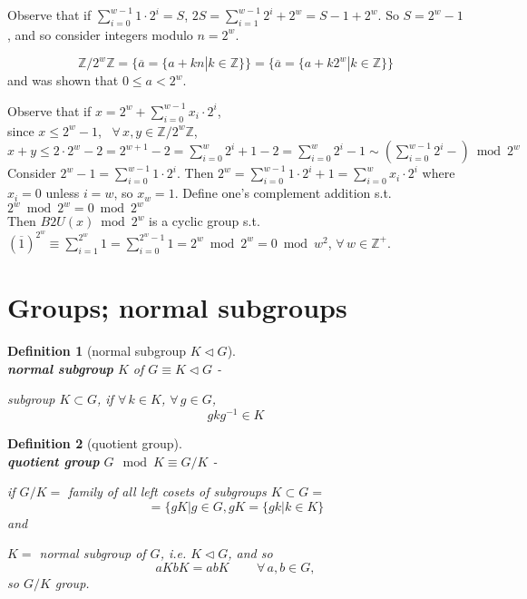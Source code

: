 \documentclass[10pt]{amsart}
\newtheorem{definition}{Definition}
\begin{document}
\begin{multicols*}{2}
Observe that if $\sum_{i=0}^{w-1} 1 \cdot 2^i = S$, $2S = \sum_{i=1}^{w-1} 2^i + 2^w = S - 1  + 2^w$. So $S = 2^w-1$, and so consider integers modulo $n=2^w$. 

\[
\mathbb{Z} / 2^w \mathbb{Z} = \lbrace \overline{a} = \lbrace a + kn | k \in \mathbb{Z} \rbrace \rbrace = \lbrace \overline{a} = \lbrace a + k 2^w | k \in \mathbb{Z} \rbrace \rbrace
\]
and was shown that $0\leq a < 2^w$.

Observe that if $x=  2^w + \sum_{i=0}^{w-1} x_i \cdot 2^i$, \\

since $x \leq 2^w - 1$, \, $\forall \, x,y \in \mathbb{Z} / 2^w \mathbb{Z}$, $x+y\leq 2 \cdot 2^w - 2 = 2^{w+1} - 2 = \sum_{i=0}^w 2^i + 1 - 2 = \sum_{i=0}^w 2^i - 1 \sim \left( \sum_{i=0}^{w-1} 2^i - \right) \bmod{2^w}$ \\


Consider $2^w - 1 = \sum_{i=0}^{w-1} 1 \cdot 2^i$. Then $2^w = \sum_{i=0}^{w-1} 1 \cdot 2^i + 1  = \sum_{i=0}^w x_i \cdot 2^i$ where $x_i = 0$ unless $i=w$, so $x_w = 1$. Define one's complement addition s.t. $2^w \bmod{2^w} = 0 \bmod 2^w$ \\

Then $B2U(x) \bmod{2^w}$ is a cyclic group s.t. $(\overline{1})^{2^w} \equiv \sum_{i=1}^{2^w} 1 = \sum_{i=0}^{2^w -1} 1 = 2^w \bmod{2^w} = 0 \bmod{w^2}$, $\forall \, w \in \mathbb{Z}^+$.

\section{Groups; normal subgroups}  

\begin{definition}[normal subgroup $K \lhd G$] \qquad \, \\
\textbf{normal subgroup} $K$ of $G \equiv K \lhd G$   - 

subgroup $K\subset G$, if $\forall \, k \in K$, $\forall \, g \in G$, 
\[
gkg^{-1} \in K
\]
\end{definition}

\begin{definition}[quotient group] \qquad \, \\
\textbf{quotient group} $G\mod{K} \equiv G/K$ -  

if $G/K = $ family of all left cosets of subgroups $K\subset G = $
\[ 
= \lbrace gK | g\in G, gK = \lbrace gk | k \in K \rbrace 
\]
and 

$K = $ normal subgroup of $G$, i.e. $K \lhd G$, and so 
\[
aK bK = abK \qquad \, \forall \, a,b \in G, 
\]
so $G/K $ group.  
\end{definition}






\end{multicols*}
\end{document}
